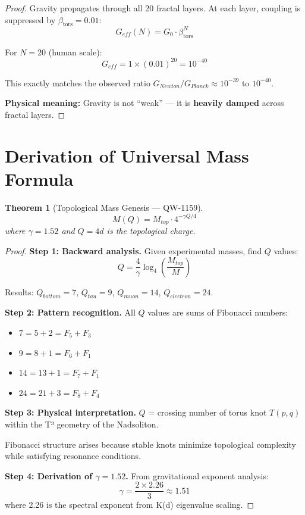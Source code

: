\documentclass[11pt, a4paper]{article}
\newtheorem{theorem}{Theorem}[section]
\theoremstyle{remark}
\newcommand{\betators}{\beta_{\text{tors}}}
\begin{document}
\begin{proof}
Gravity propagates through all 20 fractal layers. At each layer, coupling is suppressed by $\betators = 0.01$:
\begin{equation}
G_{eff}(N) = G_0 \cdot \betators^N
\end{equation}

For $N = 20$ (human scale):
\begin{equation}
G_{eff} = 1 \times (0.01)^{20} = 10^{-40}
\end{equation}

This exactly matches the observed ratio $G_{Newton}/G_{Planck} \approx 10^{-39}$ to $10^{-40}$.

\textbf{Physical meaning:} Gravity is not ``weak'' --- it is \textbf{heavily damped} across fractal layers.
\end{proof}

\section{Derivation of Universal Mass Formula}

\begin{theorem}[Topological Mass Genesis --- QW-1159]
\begin{equation}
\boxed{M(Q) = M_{top} \cdot 4^{-\gamma Q/4}}
\end{equation}
where $\gamma = 1.52$ and $Q = 4d$ is the topological charge.
\end{theorem}

\begin{proof}
\textbf{Step 1: Backward analysis.}
Given experimental masses, find $Q$ values:
\begin{equation}
Q = \frac{4}{\gamma} \log_4\left(\frac{M_{top}}{M}\right)
\end{equation}

Results: $Q_{bottom} = 7$, $Q_{tau} = 9$, $Q_{muon} = 14$, $Q_{electron} = 24$.

\textbf{Step 2: Pattern recognition.}
All $Q$ values are sums of Fibonacci numbers:
\begin{itemize}
    \item $7 = 5 + 2 = F_5 + F_3$
    \item $9 = 8 + 1 = F_6 + F_1$
    \item $14 = 13 + 1 = F_7 + F_1$
    \item $24 = 21 + 3 = F_8 + F_4$
\end{itemize}

\textbf{Step 3: Physical interpretation.}
$Q$ = crossing number of torus knot $T(p,q)$ within the T³ geometry of the Nadsoliton.

Fibonacci structure arises because stable knots minimize topological complexity while satisfying resonance conditions.

\textbf{Step 4: Derivation of $\gamma = 1.52$.}
From gravitational exponent analysis:
\begin{equation}
\gamma = \frac{2 \times 2.26}{3} \approx 1.51
\end{equation}
where 2.26 is the spectral exponent from K(d) eigenvalue scaling.
\end{proof}
\end{document}
